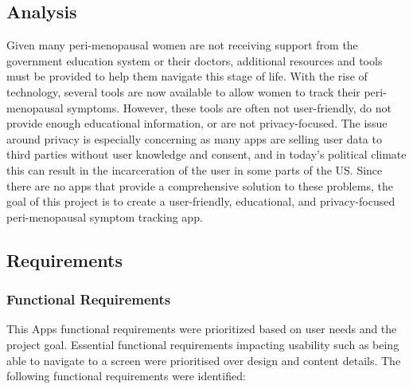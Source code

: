 \subsection{Analysis}
Given many peri-menopausal women are not receiving support from the government education system or their doctors, additional resources and tools must be provided to help them navigate this stage of life. With the rise of technology, several tools are now available to allow women to track their peri-menopausal symptoms. However, these tools are often not user-friendly, do not provide enough educational information, or are not privacy-focused. The issue around privacy is especially concerning as many apps are selling user data to third parties without user knowledge and consent, and in today's political climate this can result in the incarceration of the user in some parts of the US. Since there are no apps that provide a comprehensive solution to these problems, the goal of this project is to create a user-friendly, educational, and privacy-focused peri-menopausal symptom tracking app.

\subsection{Requirements}

\subsubsection{Functional Requirements}
This Apps functional requirements were prioritized based on user needs and the project goal. Essential functional requirements impacting usability such as being able to navigate to a screen were prioritised over design and content details. The following functional requirements were identified:

